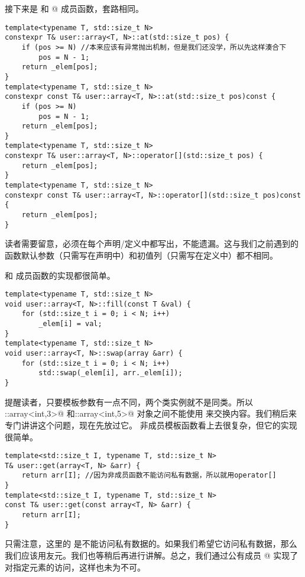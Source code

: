 接下来是 \lstinline@at@ 和 \lstinline@operator[]@ 成员函数，套路相同。
\begin{lstlisting}
template<typename T, std::size_t N>
constexpr T& user::array<T, N>::at(std::size_t pos) {
    if (pos >= N) //本来应该有异常抛出机制，但是我们还没学，所以先这样湊合下
        pos = N - 1;
    return _elem[pos];
}
template<typename T, std::size_t N>
constexpr const T& user::array<T, N>::at(std::size_t pos)const {
    if (pos >= N)
        pos = N - 1;
    return _elem[pos];
}
template<typename T, std::size_t N>
constexpr T& user::array<T, N>::operator[](std::size_t pos) {
    return _elem[pos];
}
template<typename T, std::size_t N>
constexpr const T& user::array<T, N>::operator[](std::size_t pos)const {
    return _elem[pos];
}
\end{lstlisting}
读者需要留意，\lstinline@constexpr@ 必须在每个声明/定义中都写出，不能遗漏。这与我们之前遇到的函数默认参数（只需写在声明中）和初值列（只需写在定义中）都不相同。\par
\lstinline@fill@ 和 \lstinline@swap@ 成员函数的实现都很简单。
\begin{lstlisting}
template<typename T, std::size_t N>
void user::array<T, N>::fill(const T &val) {
    for (std::size_t i = 0; i < N; i++)
        _elem[i] = val;
}
template<typename T, std::size_t N>
void user::array<T, N>::swap(array &arr) {
    for (std::size_t i = 0; i < N; i++)
        std::swap(_elem[i], arr._elem[i]);
}
\end{lstlisting}
提醒读者，只要模板参数有一点不同，两个类实例就不是同类。所以 \lstinline@user::array<int,3>@ 和\linebreak\lstinline@user::array<int,5>@ 对象之间不能使用 \lstinline@swap@ 来交换内容。我们稍后来专门讲讲这个问题，现在先放过它。
\lstinline@get@ 非成员模板函数看上去很复杂，但它的实现很简单。
\begin{lstlisting}
template<std::size_t I, typename T, std::size_t N>
T& user::get(array<T, N> &arr) {
    return arr[I]; //因为非成员函数不能访问私有数据，所以就用operator[]
}
template<std::size_t I, typename T, std::size_t N>
const T& user::get(const array<T, N> &arr) {
    return arr[I];
}
\end{lstlisting}
只需注意，这里的 \lstinline@get@ 是不能访问私有数据的。如果我们希望它访问私有数据，那么我们应该用友元。我们也等稍后再进行讲解。总之，我们通过公有成员 \lstinline@operator[]@ 实现了对指定元素的访问，这样也未为不可。\par
